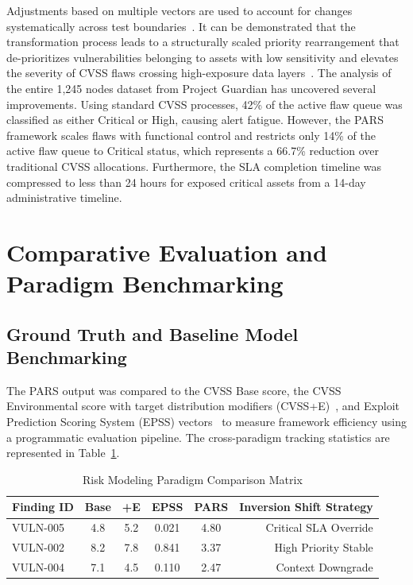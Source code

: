 \documentclass[conference,a4paper]{IEEEtran}
\begin{document}
Adjustments based on multiple vectors are used to account for changes systematically across test boundaries~\cite{b19}. It can be demonstrated that the transformation process leads to a structurally scaled priority rearrangement that de-prioritizes vulnerabilities belonging to assets with low sensitivity and elevates the severity of CVSS flaws crossing high-exposure data layers~\cite{b6}. The analysis of the entire 1,245 nodes dataset from Project Guardian has uncovered several improvements. Using standard CVSS processes, 42\% of the active flaw queue was classified as either Critical or High, causing alert fatigue. However, the PARS framework scales flaws with functional control and restricts only 14\% of the active flaw queue to Critical status, which represents a 66.7\% reduction over traditional CVSS allocations. Furthermore, the SLA completion timeline was compressed to less than 24 hours for exposed critical assets from a 14-day administrative timeline.

\section{Comparative Evaluation and Paradigm Benchmarking}
\subsection{Ground Truth and Baseline Model Benchmarking}
The PARS output was compared to the CVSS Base score, the CVSS Environmental score with target distribution modifiers (CVSS+E)~\cite{b9}, and Exploit Prediction Scoring System (EPSS) vectors~\cite{b16} to measure framework efficiency using a programmatic evaluation pipeline. The cross-paradigm tracking statistics are represented in Table~\ref{tab:paradigm_matrix}.

\begin{table}[htbp]
\caption{Risk Modeling Paradigm Comparison Matrix}
\begin{center}
\begin{tabular}{lccccr}
\toprule
\textbf{Finding ID} & \textbf{Base} & \textbf{+E} & \textbf{EPSS} & \textbf{PARS} & \textbf{Inversion Shift Strategy} \\
\midrule
VULN-005 & 4.8 & 5.2 & 0.021 & 4.80 & Critical SLA Override \\
VULN-002 & 8.2 & 7.8 & 0.841 & 3.37 & High Priority Stable \\
VULN-004 & 7.1 & 4.5 & 0.110 & 2.47  & Context Downgrade \\
\bottomrule
\end{tabular}
\label{tab:paradigm_matrix}
\end{center}
\end{table}
\end{document}
